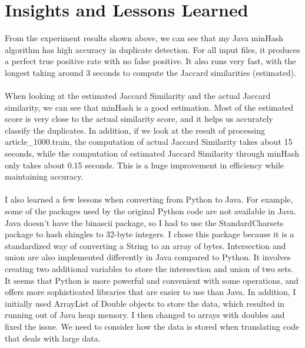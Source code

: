 \documentclass[9pt,twoside]{exam}
\begin{document}
\section*{Insights and Lessons Learned}
From the experiment results shown above, we can see that my Java minHash algorithm has high accuracy in duplicate detection. For all input files, it produces a perfect true positive rate with no false positive. It also runs very fast, with the longest taking around 3 seconds to compute the Jaccard similarities (estimated). \\\\
When looking at the estimated Jaccard Similarity and the actual Jaccard similarity, we can see that minHash is a good estimation. Most of the estimated score is very close to the actual similarity score, and it helps us accurately classify the duplicates. In addition, if we look at the result of processing article\_1000.train, the computation of actual Jaccard Similarity takes about 15 seconds, while the computation of estimated Jaccard Similarity through minHash only takes about 0.15 seconds. This is a huge improvement in efficiency while maintaining accuracy. \\\\
I also learned a few lessons when converting from Python to Java. For example, some of the packages used by the original Python code are not available in Java. Java doesn't have the binascii package, so I had to use the StandardCharsets package to hash shingles to 32-byte integers. I chose this package because it is a standardized way of converting a String to an array of bytes. Intersection and union are also implemented differently in Java compared to Python. It involves creating two additional variables to store the intersection and union of two sets. It seems that Python is more powerful and convenient with some operations, and offers more sophisticated libraries that are easier to use than Java. In addition, I initially used ArrayList of Double objects to store the data, which resulted in running out of Java heap memory. I then changed to arrays with doubles and fixed the issue. We need to consider how the data is stored when translating code that deals with large data.
\end{document}
